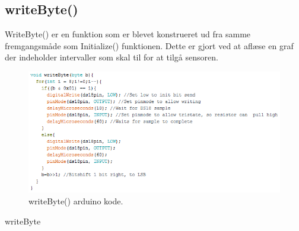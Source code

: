 
\subsection{writeByte()}
WriteByte() er en funktion som er blevet konstrueret ud fra samme fremgangsmåde som Initialize() funktionen. Dette er gjort ved at aflæse en graf der indeholder intervaller som skal til for at tilgå sensoren.

\begin{figure}[h!]
  \centering
  \includegraphics[width=1\textwidth]{figures/write_byte.png}
  \caption{writeByte() arduino kode.}
  \label{write_byte}
\end{figure}

writeByte 